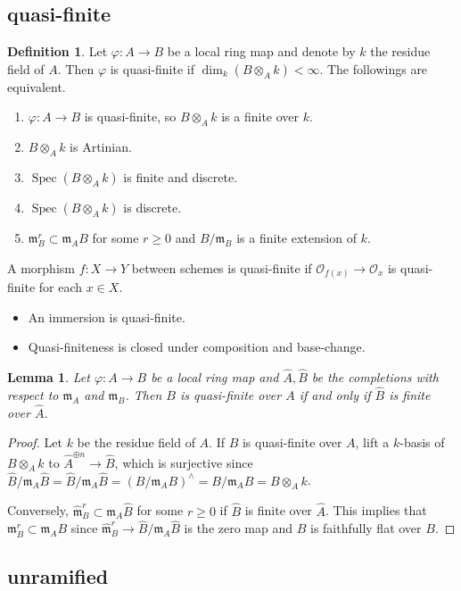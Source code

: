 \documentclass[leqno]{amsart}
\DeclareMathOperator{\Spec}{Spec}
\newcommand{\oo}{\mathcal O}
\newcommand{\1}{\mathbf{1}}
\newcommand{\fm}{\mathfrak m}
\newtheorem{lem}[thm]{Lemma}
\theoremstyle{definition}
\newtheorem{defn}[thm]{Definition}
\theoremstyle{remark}
\begin{document}
\subsection{quasi-finite}
\begin{defn}
	Let $\varphi\colon A\to B$ be a local ring map 
	and denote by $k$ the residue field of $A$.
	Then $\varphi$ is quasi-finite
	if  $\dim_{k}(B\otimes_Ak)<\infty$.
	The followings are equivalent.
	\begin{enumerate}[label=(\alph*)]
	\item $\varphi\colon A\to B$ is quasi-finite,
		so $B\otimes_Ak$ is a finite over $k$.
	\item $B\otimes_Ak$ is Artinian.
	\item $\Spec(B\otimes_Ak)$ is finite and discrete.
	\item $\Spec(B\otimes_Ak)$ is discrete.
	\item $\fm_B^r\subset \fm_AB$ for some  $r\geq 0$
		and  $B/\fm_B$ is a finite extension of $k$.
	\end{enumerate}
	A morphism $f\colon X\to Y$ between schemes
	is quasi-finite if
	$\oo_{f(x)}\to\oo_x$ is quasi-finite for each $x\in X$.
\begin{itemize}
	\item An immersion is quasi-finite.
	\item Quasi-finiteness is closed under
		composition and base-change.
\end{itemize}
\end{defn}
\begin{lem}
	Let $\varphi\colon A\to B$ be a local ring map
	and $\hat{A}, \hat{B}$ be the completions
	with respect to $\fm_A$ and  $\fm_B$.
	Then $B$ is quasi-finite over $A$
	if and only if
	$\hat{B}$ is finite over $\hat{A}$.
\end{lem}
\begin{proof}
	Let $k$ be the residue field of  $A$.
	If $B$ is quasi-finite over  $A$,
	lift a $k$-basis of  $B\otimes_Ak$ to
	$\hat{A}^{\oplus n}\to \hat{B}$,
	which is surjective since 
	$\hat{B}/\hat{\fm}_A\hat{B} =\hat{B}/\fm_A\hat{B}=
	(B/\fm_AB)^\wedge=B/\fm_AB=B\otimes_Ak$.

	Conversely, 
	$\hat{\fm}_B^r\subset \fm_A\hat{B}$
	for some $r\geq 0$ if $\hat{B}$ is finite over $\hat{A}$.
	This implies that $\fm_B^r\subset \fm_AB$
	since $\hat{\fm}_B^r\to \hat{B}/\fm_A\hat{B}$ is 
	the zero map and $\hat{B}$ is faithfully flat over $B$.
\end{proof}


\subsection{unramified}
\end{document}
